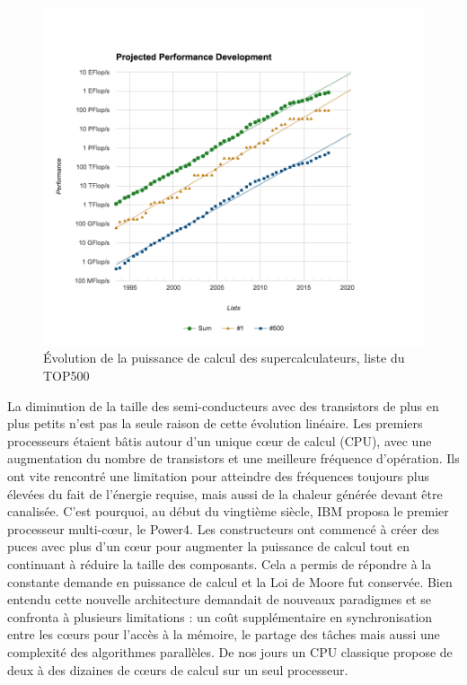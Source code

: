\documentclass[12pt,a4paper]{report}
\begin{document}
\begin{figure}[ht!]
\centering
\includegraphics[width=.7\linewidth]{../figures/introduction/top500_list_approximation.png}
\caption{\'Evolution de la puissance de calcul des supercalculateurs, liste du TOP500}
\label{fig:intro_top500}
\end{figure}

La diminution de la taille des semi-conducteurs avec des transistors de plus en plus petits n'est pas la seule raison de cette évolution linéaire. 
Les premiers processeurs étaient bâtis autour d'un unique cœur de calcul (CPU), avec une augmentation du nombre de transistors et une meilleure fréquence d'opération.
Ils ont vite rencontré une limitation pour atteindre des fréquences toujours plus élevées du fait de l'énergie requise, mais aussi de la chaleur générée devant être canalisée.
C'est pourquoi, au début du vingtième siècle, IBM proposa le premier processeur multi-cœur, le Power4.
Les constructeurs ont commencé à créer des puces avec plus d’un cœur pour augmenter la puissance de calcul tout en continuant à réduire la taille des composants. 
Cela a permis de répondre à la constante demande en puissance de calcul et la Loi de Moore fut conservée. 
Bien entendu cette nouvelle architecture demandait de nouveaux paradigmes et se confronta à plusieurs limitations : un coût supplémentaire en synchronisation entre les cœurs pour l'accès à la mémoire, le partage des tâches mais aussi une complexité des algorithmes parallèles. 
De nos jours un CPU classique propose de deux à des dizaines de cœurs de calcul sur un seul processeur.\\
\end{document}
